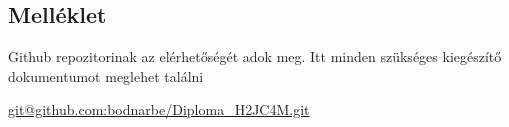 \appendix
\chapter*{\melleklet}
\setcounter{chapter}{\annexletter} %
\setcounter{section}{0}

\section{Melléklet}

Github repozitorinak az elérhetőségét adok meg. Itt minden szükséges kiegészítő dokumentumot meglehet találni

\url{git@github.com:bodnarbe/Diploma_H2JC4M.git}
